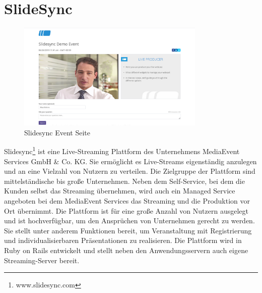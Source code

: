 %
%
%
%
%




\section{SlideSync}
\begin{figure}[!h]
	\centering
	\includegraphics[width=0.8\textwidth]{figures/Slidesync_screenshot}
	\caption[A Figure Short-Title]{Slidesync Event Seite}
	\label{fig:slidesync_screenshot}
\end{figure}
Slidesync\footnote{www.slidesync.com} ist eine Live-Streaming Plattform des Unternehmens MediaEvent Services GmbH & Co. KG. Sie ermöglicht es Live-Streams eigenständig anzulegen und an eine Vielzahl von Nutzern zu verteilen. Die Zielgruppe der Plattform sind mittelständische bis große Unternehmen. Neben dem Self-Service, bei dem die Kunden selbst das Streaming übernehmen, wird auch ein Managed Service angeboten bei dem MediaEvent Services das Streaming und die Produktion vor Ort übernimmt. Die Plattform ist für eine große Anzahl von Nutzern ausgelegt und ist hochverfügbar, um den Ansprüchen von Unternehmen gerecht zu werden. Sie stellt unter anderem Funktionen bereit, um Veranstaltung mit Registrierung und individualisierbaren Präsentationen zu realisieren. Die Plattform wird in Ruby on Rails entwickelt und stellt neben den Anwendungsservern auch eigene Streaming-Server bereit.

